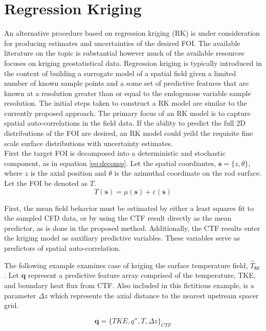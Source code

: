 \section{Regression Kriging}

An alternative procedure based on regression kriging (RK) is under consideration for producing estimates and uncertainties of the desired FOI.
The available literature on the topic is substantial however much of the available resources focuses on kriging geostatistical data.  Regression kriging is typically introduced in the context of building
a surrogate model of a spatial field given a limited number of known sample points and a some set of predictive features that are known at a resolution greater than or equal to the endogenous variable sample resolution.
The initial steps taken to construct a RK model are similar to the currently proposed approach.  The primary focus of an RK model is to capture spatial auto-correlations in the field data.   If the ability to predict the full 2D distributions of the FOI are desired, an RK model could yeild the requisite fine scale surface distributions with uncertainty estimates. \\

First the target FOI is decomposed into a deterministic and stochastic component, as in equation \ref{eq:decomp}.
Let the spatial coordiantes, $\mathbf{s} = \{z, \theta\}$,
where $z$ is the axial position and $\theta$ is the azimuthal coordinate on the rod surface. Let the FOI be denoted as $T$.
\begin{equation}
T(\mathbf s) = \mu(\mathbf s) + \varepsilon(\mathbf s)
\label{eq:decomp}
\end{equation}

First, the mean field behavior must be estimated by either a least squares fit to the sampled CFD data, or by using the CTF result directly as the mean predictor, as is done in the proposed method. 
Additionally, the CTF results enter the kriging model as auxiliary predictive variables.  These variables serve as predictors of spatial auto-correlation.

The following example examines case of kriging the surface temperature field, $\hat T_\mathtt{RK}$.
Let $\mathbf{q}$ represent a predictive feature array comprised of the temperature,
TKE, and boundary heat flux from CTF.  Also included in this fictitious example, is a parameter $\Delta z$ which represents the axial distance to the nearest upstream spacer grid.

\begin{equation}
\mathbf{q} = \{TKE, q'', T, \Delta z \}_{CTF}
\end{equation}

